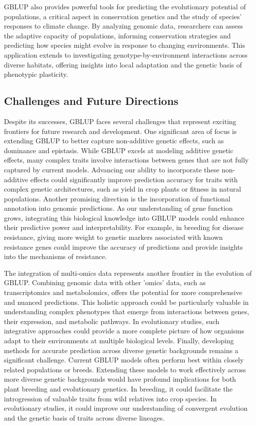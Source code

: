 \documentclass[12pt,a4paper]{article}
\begin{document}
GBLUP also provides powerful tools for predicting the evolutionary potential of populations, a critical aspect in conservation genetics and the study of species' responses to climate change. By analyzing genomic data, researchers can assess the adaptive capacity of populations, informing conservation strategies and predicting how species might evolve in response to changing environments. This application extends to investigating genotype-by-environment interactions across diverse habitats, offering insights into local adaptation and the genetic basis of phenotypic plasticity.

\subsection{Challenges and Future Directions}

Despite its successes, GBLUP faces several challenges that represent exciting frontiers for future research and development. One significant area of focus is extending GBLUP to better capture non-additive genetic effects, such as dominance and epistasis. While GBLUP excels at modeling additive genetic effects, many complex traits involve interactions between genes that are not fully captured by current models. Advancing our ability to incorporate these non-additive effects could significantly improve prediction accuracy for traits with complex genetic architectures, such as yield in crop plants or fitness in natural populations. Another promising direction is the incorporation of functional annotation into genomic predictions. As our understanding of gene function grows, integrating this biological knowledge into GBLUP models could enhance their predictive power and interpretability. For example, in breeding for disease resistance, giving more weight to genetic markers associated with known resistance genes could improve the accuracy of predictions and provide insights into the mechanisms of resistance.

The integration of multi-omics data represents another frontier in the evolution of GBLUP. Combining genomic data with other 'omics' data, such as transcriptomics and metabolomics, offers the potential for more comprehensive and nuanced predictions. This holistic approach could be particularly valuable in understanding complex phenotypes that emerge from interactions between genes, their expression, and metabolic pathways. In evolutionary studies, such integrative approaches could provide a more complete picture of how organisms adapt to their environments at multiple biological levels. Finally, developing methods for accurate prediction across diverse genetic backgrounds remains a significant challenge. Current GBLUP models often perform best within closely related populations or breeds. Extending these models to work effectively across more diverse genetic backgrounds would have profound implications for both plant breeding and evolutionary genetics. In breeding, it could facilitate the introgression of valuable traits from wild relatives into crop species. In evolutionary studies, it could improve our understanding of convergent evolution and the genetic basis of traits across diverse lineages.
\end{document}
